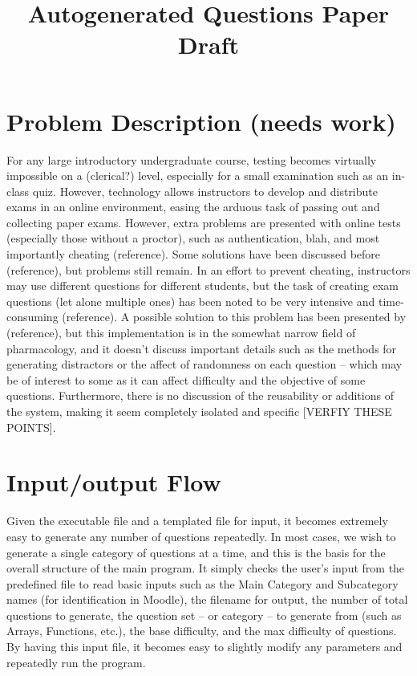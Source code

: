 \documentclass{article}
\title{Autogenerated Questions Paper Draft}
\date{ }
\begin{document}
\maketitle

\tableofcontents


\section{Problem Description (needs work)}
For any large introductory undergraduate course, testing becomes virtually impossible on a (clerical?) level, especially for a small examination
such as an in-class quiz. However, technology allows instructors to develop and distribute exams in an online environment,
easing the arduous task of passing out and collecting paper exams. However, extra problems are presented with online tests (especially those
without a proctor), such as authentication, blah, and most importantly cheating (reference). Some solutions have been discussed before (reference),
but problems still remain. In an effort to prevent cheating, instructors may use different questions for different students, but the task of creating exam
questions (let alone multiple ones) has been noted to be very intensive and time-consuming (reference). A possible solution to this problem has been
presented by (reference), but this implementation is in the somewhat narrow field of pharmacology, and it doesn't discuss important details such as
the methods for generating distractors or the affect of randomness on each question -- which may be of interest to some as it can affect difficulty and
the objective of some questions. Furthermore, there is no discussion of the reusability or additions of the system, making it seem completely isolated
and specific [VERFIY THESE POINTS].


\section{Input/output Flow}

Given the executable file and a templated file for input, it becomes extremely easy to generate any number of questions
repeatedly. In most cases, we wish to generate a single category of questions at a time, and this is the basis for the
overall structure of the main program. It simply checks the user's input from the predefined file to read basic inputs
such as the Main Category and Subcategory names (for identification in Moodle), the filename for output, the number of
total questions to generate, the question set -- or category -- to generate from (such as Arrays, Functions, etc.),
the base difficulty, and the max difficulty of questions. By having this input file, it becomes easy to slightly modify
any parameters and repeatedly run the program.
\end{document}
